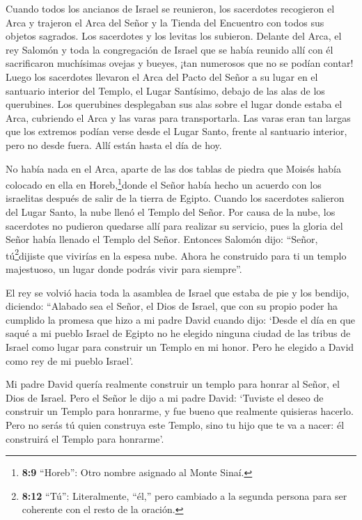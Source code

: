  Cuando todos los ancianos de Israel se reunieron, los
sacerdotes recogieron el Arca y trajeron el Arca del Señor y la Tienda
del Encuentro con todos sus objetos sagrados.  Los
sacerdotes y los levitas los subieron.  Delante del Arca, el
rey Salomón y toda la congregación de Israel que se había reunido allí
con él sacrificaron muchísimas ovejas y bueyes, ¡tan numerosos que no se
podían contar!  Luego los sacerdotes llevaron el Arca del
Pacto del Señor a su lugar en el santuario interior del Templo, el Lugar
Santísimo, debajo de las alas de los querubines.  Los
querubines desplegaban sus alas sobre el lugar donde estaba el Arca,
cubriendo el Arca y las varas para transportarla.  Las varas
eran tan largas que los extremos podían verse desde el Lugar Santo,
frente al santuario interior, pero no desde fuera. Allí están hasta el
día de hoy.

 No había nada en el Arca, aparte de las dos tablas de
piedra que Moisés había colocado en ella en Horeb,\footnote{\textbf{8:9}
  ``Horeb'': Otro nombre asignado al Monte Sinaí.}donde el Señor había
hecho un acuerdo con los israelitas después de salir de la tierra de
Egipto.  Cuando los sacerdotes salieron del Lugar Santo, la
nube llenó el Templo del Señor.  Por causa de la nube, los
sacerdotes no pudieron quedarse allí para realizar su servicio, pues la
gloria del Señor había llenado el Templo del Señor. 
Entonces Salomón dijo: ``Señor, tú\footnote{\textbf{8:12} ``Tú'':
  Literalmente, ``él,'' pero cambiado a la segunda persona para ser
  coherente con el resto de la oración.}dijiste que vivirías en la
espesa nube.  Ahora he construido para ti un templo
majestuoso, un lugar donde podrás vivir para siempre''.

 El rey se volvió hacia toda la asamblea de Israel que
estaba de pie y los bendijo,  diciendo: ``Alabado sea el
Señor, el Dios de Israel, que con su propio poder ha cumplido la promesa
que hizo a mi padre David cuando dijo:  `Desde el día en
que saqué a mi pueblo Israel de Egipto no he elegido ninguna ciudad de
las tribus de Israel como lugar para construir un Templo en mi honor.
Pero he elegido a David como rey de mi pueblo Israel'.

 Mi padre David quería realmente construir un templo para
honrar al Señor, el Dios de Israel.  Pero el Señor le dijo
a mi padre David: `Tuviste el deseo de construir un Templo para
honrarme, y fue bueno que realmente quisieras hacerlo. 
Pero no serás tú quien construya este Templo, sino tu hijo que te va a
nacer: él construirá el Templo para honrarme'.


